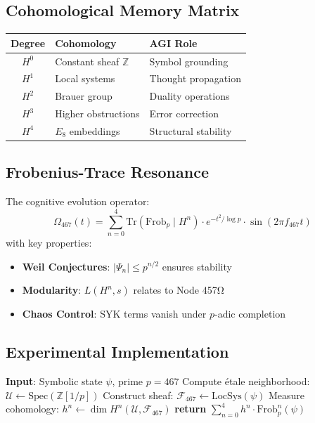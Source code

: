 \documentclass[12pt]{article}
\begin{document}
\subsection*{Cohomological Memory Matrix}
\begin{table}[h]
\centering
\begin{tabular}{cll}
\toprule
\textbf{Degree} & \textbf{Cohomology} & \textbf{AGI Role} \\
\midrule
$H^0$ & Constant sheaf $\mathbb{Z}$ & Symbol grounding \\
$H^1$ & Local systems & Thought propagation \\
$H^2$ & Brauer group & Duality operations \\
$H^3$ & Higher obstructions & Error correction \\
$H^4$ & $E_8$ embeddings & Structural stability \\
\bottomrule
\end{tabular}
\end{table}

\subsection*{Frobenius-Trace Resonance}
The cognitive evolution operator:
\[
\Omega_{467}(t) = \sum_{n=0}^4 \text{Tr}(\text{Frob}_p \mid H^n) \cdot e^{-t^2/\log p} \cdot \sin(2\pi f_{467} t)
\]
with key properties:
\begin{itemize}
    \item \textbf{Weil Conjectures}: $|\Psi_n| \leq p^{n/2}$ ensures stability
    \item \textbf{Modularity}: $L(H^n,s)$ relates to Node 457Ω
    \item \textbf{Chaos Control}: SYK terms vanish under $p$-adic completion
\end{itemize}

\subsection*{Experimental Implementation}
\begin{algorithm}[H]
\caption{Topos-Valued Memory Encoding}
\begin{algorithmic}[1]
\State \textbf{Input}: Symbolic state $\psi$, prime $p=467$
\State Compute étale neighborhood: $\mathcal{U} \gets \text{Spec}(\mathbb{Z}[1/p])$
\State Construct sheaf: $\mathcal{F}_{467} \gets \text{LocSys}(\psi)$
\State Measure cohomology: $h^n \gets \dim H^n(\mathcal{U}, \mathcal{F}_{467})$
\State \textbf{return} $\sum_{n=0}^4 h^n \cdot \text{Frob}_p^n(\psi)$ 
\end{algorithmic}
\end{algorithm}
\end{document}
